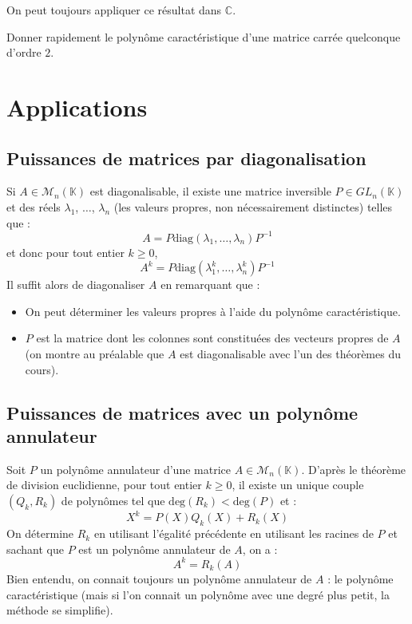 \documentclass[a4paper,10pt]{report}
\begin{document}
\begin{rem} On peut toujours appliquer ce résultat dans $\mathbb{C}$.
\end{rem}

\begin{exa} Donner rapidement le polynôme caractéristique d'une matrice carrée quelconque d'ordre $2$.
\end{exa}

\section{Applications}

\subsection{Puissances de matrices par diagonalisation}

\noindent Si $A \in \mathcal{M}_n(\mathbb{K})$ est diagonalisable, il existe une matrice inversible $P \in GL_n(\mathbb{K})$ et des réels $\lambda_1$, $\ldots$, $\lambda_n$ (les valeurs propres, non nécessairement distinctes) telles que :
$$ A = P \textrm{diag}(\lambda_1, \ldots, \lambda_n) P^{-1}$$
et donc pour tout entier $k \geq 0$,
$$ A^k = P \textrm{diag}(\lambda_1^k, \ldots, \lambda_n^k) P^{-1}$$
\newpage
\noindent Il suffit alors de diagonaliser $A$ en remarquant que :
\begin{itemize}
\item On peut déterminer les valeurs propres à l'aide du polynôme caractéristique.
\item $P$ est la matrice dont les colonnes sont constituées des vecteurs propres de $A$ (on montre au préalable que $A$ est diagonalisable avec l'un des théorèmes du cours).
\end{itemize}

\subsection{Puissances de matrices avec un polynôme annulateur}
\noindent Soit $P$ un polynôme annulateur d'une matrice $A \in \mathcal{M}_n(\mathbb{K})$. D'après le théorème de division euclidienne, pour tout entier $k \geq 0$, il existe un unique couple $(Q_k,R_k)$ de polynômes tel que $\textrm{deg}(R_k) < \textrm{deg}(P)$ et :
$$ X^k = P(X)Q_k(X) + R_k(X)$$
On détermine $R_k$ en utilisant l'égalité précédente en utilisant les racines de $P$ et sachant que $P$ est un polynôme annulateur de $A$, on a :
$$ A^k = R_k(A)$$
Bien entendu, on connait toujours un polynôme annulateur de $A$ : le polynôme caractéristique (mais si l'on connait un polynôme avec une degré plus petit, la méthode se simplifie). 
\end{document}
